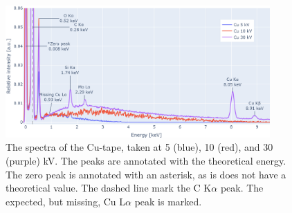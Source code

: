 \begin{figure}[h]
    \centering
    \includegraphics[width=0.90\textwidth]{figures/each_spectra/Cu_everything.png}
    \caption{
        The spectra of the Cu-tape, taken at 5 (blue), 10 (red), and 30 (purple) kV.
        The peaks are annotated with the theoretical energy.
        The zero peak is annotated with an asterisk, as is does not have a theoretical value.
        The dashed line mark the C K$\alpha$ peak.
        The expected, but missing, Cu L$\alpha$ peak is marked.
    }
    \label{fig:results:Spectra_Cu}
\end{figure}

